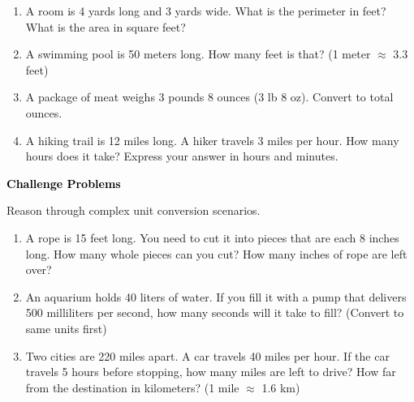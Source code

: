 \documentclass[12pt, letterpaper, fleqn]{article}
\begin{document}
\begin{enumerate}[itemsep=2.3cm, leftmargin=0.6cm]

\item A room is 4 yards long and 3 yards wide. What is the perimeter in feet? What is the area in square feet?

\vspace{2.2cm}

\item A swimming pool is 50 meters long. How many feet is that? (1 meter $\approx$ 3.3 feet)

\vspace{2.2cm}

\item A package of meat weighs 3 pounds 8 ounces (3 lb 8 oz). Convert to total ounces.

\vspace{2.2cm}

\item A hiking trail is 12 miles long. A hiker travels 3 miles per hour. How many hours does it take? Express your answer in hours and minutes.

\vspace{2.2cm}

\end{enumerate}

\newpage

\begin{tcolorbox}[colback=customteal!20]
\large\textcolor{black}{\textbf{Challenge Problems}}
\end{tcolorbox}

\noindent
Reason through complex unit conversion scenarios.

\vspace{3mm}

\begin{enumerate}[itemsep=2.4cm, leftmargin=0.6cm]

\item A rope is 15 feet long. You need to cut it into pieces that are each 8 inches long. How many whole pieces can you cut? How many inches of rope are left over?

\vspace{2.3cm}

\item An aquarium holds 40 liters of water. If you fill it with a pump that delivers 500 milliliters per second, how many seconds will it take to fill? (Convert to same units first)

\vspace{2.3cm}

\item Two cities are 220 miles apart. A car travels 40 miles per hour. If the car travels 5 hours before stopping, how many miles are left to drive? How far from the destination in kilometers? (1 mile $\approx$ 1.6 km)

\vspace{2.5cm}

\end{enumerate}
\end{document}
